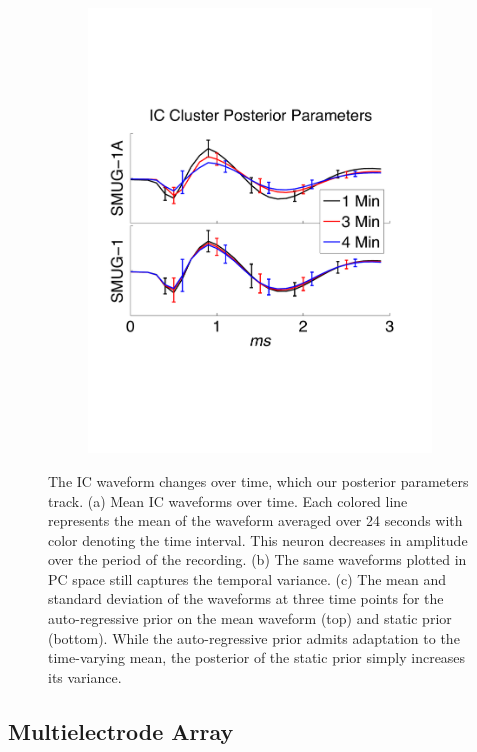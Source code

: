 \begin{center}
\begin{figure}
\begin{subfigure}[b]{.33\textwidth}
\includegraphics[width=\textwidth]{../figs/new/ARvsStationary.pdf}
\caption{}
\label{fig:AR}
\end{subfigure}
\caption{
The IC waveform changes over time, which our posterior parameters track. 
(a) Mean IC waveforms over time.  Each colored line represents the mean of the waveform averaged over 24 seconds with color denoting the time interval.  This neuron decreases in amplitude over the period of the recording. 
(b) The same waveforms plotted in PC space still captures the temporal variance.
(c) The mean and standard deviation of the waveforms at three time points for the auto-regressive prior on the mean waveform (top) and static prior (bottom). While the auto-regressive prior admits adaptation to the time-varying mean, the posterior of the static prior simply increases its variance.  
}
\end{figure}
\end{center}

\vspace{-10pt}
\subsection{Multielectrode Array} \label{sub:multi}


